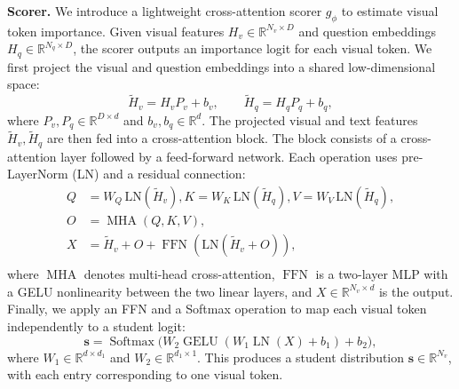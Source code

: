 \textbf{Scorer.}
We introduce a lightweight cross-attention scorer $g_\phi$ to estimate visual token importance. Given visual features $H_v\in\mathbb{R}^{N_v\times D}$ and question embeddings $H_q\in\mathbb{R}^{N_q\times D}$, the scorer outputs an importance logit for each visual token. We first project the visual and question embeddings into a shared low-dimensional space:
\begin{equation}
\tilde{H}_v=H_v P_v+b_v,\qquad
\tilde{H}_q=H_q P_q+b_q,
\label{eq:input_projection}
\end{equation}
where $P_v,P_q\in\mathbb{R}^{D\times d}$ and $b_v,b_q\in\mathbb{R}^{d}$.
The projected visual and text features $\tilde{H}_v,\tilde{H}_q$ are then fed into a cross-attention block. The block consists of a cross-attention layer followed by a feed-forward network. Each operation uses pre-LayerNorm (LN) and a residual connection:
\begin{equation}
\begin{aligned}
Q &= W_Q\,\mathrm{LN}(\tilde{H}_v),
K = W_K\,\mathrm{LN}(\tilde{H}_q),
V = W_V\,\mathrm{LN}(\tilde{H}_q), \\
O &= \operatorname{MHA}(Q,K,V), \\
X &= \tilde{H}_v + O
+\operatorname{FFN}\left(\mathrm{LN}(\tilde{H}_v + O)\right), \\
\end{aligned}
\end{equation}
where $\operatorname{MHA}$ denotes multi-head cross-attention, $\operatorname{FFN}$ is a two-layer MLP with a GELU nonlinearity between the two linear layers, and $X\in\mathbb{R}^{N_v\times d}$ is the output. Finally, we apply an FFN and a Softmax operation to map each visual token independently to a student logit:
\begin{equation}
\mathbf{s}=\operatorname{Softmax}\big(W_2\operatorname{GELU}
\left(
W_1\operatorname{LN}(X)+b_1
\right)+b_2\big),
\label{eq:token_scoring}
\end{equation}
where $W_1\in\mathbb{R}^{d\times d_1}$ and $W_2\in\mathbb{R}^{d_1\times 1}$. This produces a student distribution $\mathbf{s}\in\mathbb{R}^{N_v}$, with each entry corresponding to one visual token.

